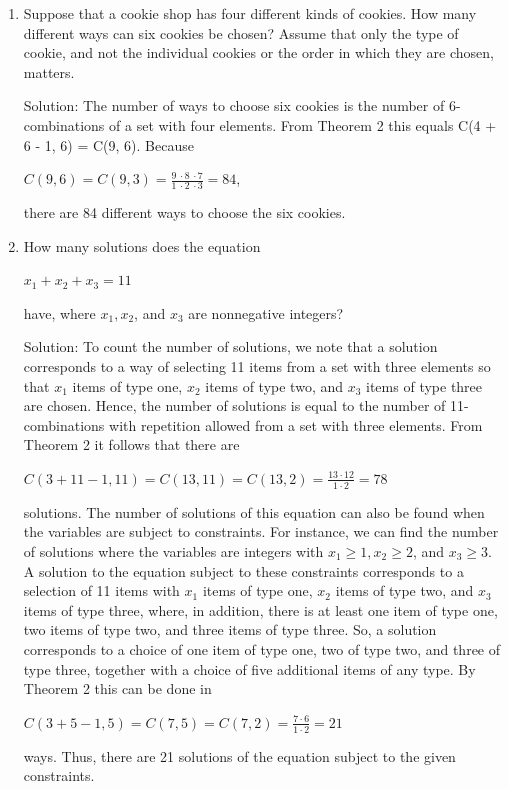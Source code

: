 \documentclass[11pt,a4paper]{book}
\begin{document}
\begin{enumerate}[label=Example~\arabic*]
\item Suppose that a cookie shop has four different kinds of cookies.
How many different ways can six cookies be chosen?
Assume that only the type of cookie, and not the individual cookies or the order in which they are chosen, matters.

Solution: The number of ways to choose six cookies is the number of 6-combinations of a set
with four elements.
From Theorem 2 this equals C(4 + 6 - 1, 6) = C(9, 6).
Because

$C(9, 6) = C(9, 3) = \frac{9~\cdot8~\cdot7}{1~\cdot2~\cdot3} = 84$,

there are 84 different ways to choose the six cookies.

\item How many solutions does the equation

$x_1 + x_2 + x_3 = 11$

have, where $x_1, x_2$, and $x_3$ are nonnegative integers?

Solution: To count the number of solutions, we note that a solution corresponds to a way of selecting 11 items from a set with three elements so that $x_1$ items of type one, $x_2$ items of type two, and $x_3$ items of type three are chosen.
Hence, the number of solutions is equal to the number of 11-combinations with repetition allowed from a set with three elements.
From Theorem 2 it follows that there are

$C(3 + 11 - 1, 11) = C(13, 11) = C(13, 2) = \frac{13 \cdot 12}{1 \cdot 2} = 78$

solutions.
The number of solutions of this equation can also be found when the variables are subject to constraints.
For instance, we can find the number of solutions where the variables are integers with $x_1 \geq 1, x_2 \geq 2$, and $x_3 \geq 3$.
A solution to the equation subject to these constraints corresponds to a selection of 11 items with $x_1$ items of type one, $x_2$ items of type two, and $x_3$ items of type three, where, in addition, there is at least one item of type one, two items of type two, and three items of type three.
So, a solution corresponds to a choice of one item of type one, two of type two, and three of type three, together with a choice of five additional items of any type.
By Theorem 2 this can be done in

$C(3 + 5 - 1, 5) = C(7, 5) = C(7, 2) = \frac{7 \cdot 6}{1 \cdot 2} = 21$

ways.
Thus, there are 21 solutions of the equation subject to the given constraints.


\end{enumerate}
\end{document}
